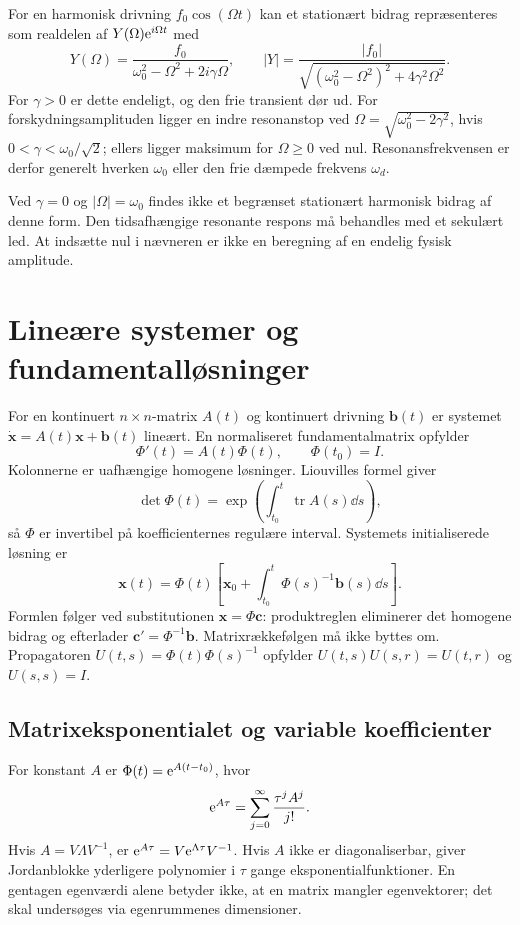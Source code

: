 For en harmonisk drivning $f_0\cos(\Omega t)$ kan et stationært bidrag
repræsenteres som realdelen af $Y(\Omega)\mathrm{e}^{i\Omega t}$ med
\[
 Y(\Omega)=\frac{f_0}{\omega_0^2-\Omega^2+2i\gamma\Omega},\qquad
 |Y|=\frac{|f_0|}{\sqrt{(\omega_0^2-\Omega^2)^2+4\gamma^2\Omega^2}}.
\]
For $\gamma>0$ er dette endeligt, og den frie transient dør ud.
For forskydningsamplituden ligger en indre resonanstop ved
$\Omega=\sqrt{\omega_0^2-2\gamma^2}$, hvis
$0<\gamma<\omega_0/\sqrt2$; ellers ligger maksimum for
$\Omega\ge0$ ved nul. Resonansfrekvensen er derfor generelt hverken
$\omega_0$ eller den frie dæmpede frekvens $\omega_d$.

Ved $\gamma=0$ og $|\Omega|=\omega_0$ findes ikke et begrænset
stationært harmonisk bidrag af denne form. Den tidsafhængige resonante
respons må behandles med et sekulært led. At indsætte nul i nævneren
er ikke en beregning af en endelig fysisk amplitude.

\section{Lineære systemer og fundamentalløsninger}
\label{sec:ode-systemer}
For en kontinuert $n\times n$-matrix $A(t)$ og kontinuert drivning
$\boldsymbol{b}(t)$ er systemet
$\dot{\boldsymbol{x}}=A(t)\boldsymbol{x}+\boldsymbol{b}(t)$ lineært.
En normaliseret fundamentalmatrix opfylder
\[
 \Phi'(t)=A(t)\Phi(t),\qquad \Phi(t_0)=I.
\]
Kolonnerne er uafhængige homogene løsninger. Liouvilles formel giver
\[
 \det\Phi(t)=\exp\!\left(\int_{t_0}^{t}\operatorname{tr}A(s)\dd s\right),
\]
så $\Phi$ er invertibel på koefficienternes regulære interval. Systemets
initialiserede løsning er
\begin{equation}
 \boldsymbol{x}(t)=\Phi(t)\left[\boldsymbol{x}_0+
                  \int_{t_0}^{t}\Phi(s)^{-1}\boldsymbol{b}(s)\dd s\right].
 \label{eq:ode-variation-matrix}
\end{equation}
Formlen følger ved substitutionen $\boldsymbol{x}=\Phi\boldsymbol{c}$:
produktreglen eliminerer det homogene bidrag og efterlader
$\boldsymbol{c}'=\Phi^{-1}\boldsymbol{b}$. Matrixrækkefølgen må ikke
byttes om. Propagatoren $U(t,s)=\Phi(t)\Phi(s)^{-1}$ opfylder
$U(t,s)U(s,r)=U(t,r)$ og $U(s,s)=I$.

\subsection{Matrixeksponentialet og variable koefficienter}
For konstant $A$ er $\Phi(t)=\mathrm{e}^{A(t-t_0)}$, hvor
\[
 \mathrm{e}^{A\tau}=\sum_{j=0}^{\infty}\frac{\tau^jA^j}{j!}.
\]
Hvis $A=V\Lambda V^{-1}$, er $\mathrm{e}^{A\tau}=V\mathrm{e}^{\Lambda\tau}V^{-1}$.
Hvis $A$ ikke er diagonaliserbar, giver Jordanblokke yderligere
polynomier i $\tau$ gange eksponentialfunktioner. En gentagen egenværdi
alene betyder ikke, at en matrix mangler egenvektorer; det skal
undersøges via egenrummenes dimensioner.

